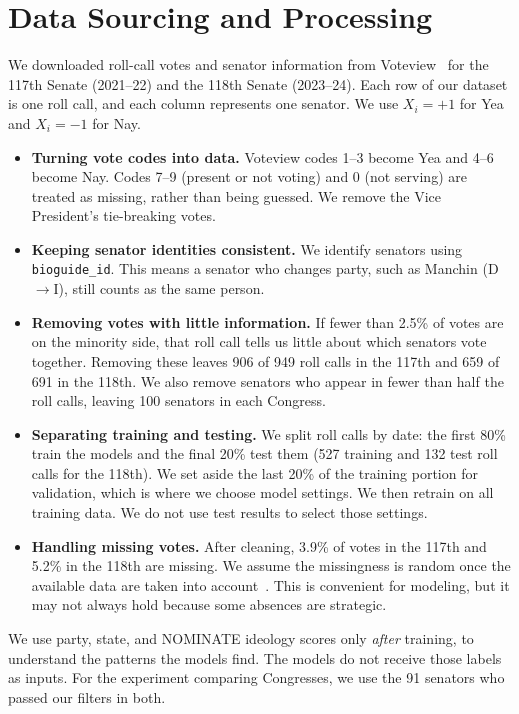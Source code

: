 \documentclass[10pt]{article}
\begin{document}
\section{Data Sourcing and Processing}
We downloaded roll-call votes and senator information from Voteview~\cite{voteview} for the 117th Senate (2021--22) and the 118th Senate (2023--24). Each row of our dataset is one roll call, and each column represents one senator. We use $X_i=+1$ for Yea and $X_i=-1$ for Nay.
\begin{itemize}
\item \textbf{Turning vote codes into data.} Voteview codes 1--3 become Yea and 4--6 become Nay. Codes 7--9 (present or not voting) and 0 (not serving) are treated as missing, rather than being guessed. We remove the Vice President's tie-breaking votes.
\item \textbf{Keeping senator identities consistent.} We identify senators using \texttt{bioguide\_id}. This means a senator who changes party, such as Manchin (D$\to$I), still counts as the same person.
\item \textbf{Removing votes with little information.} If fewer than 2.5\% of votes are on the minority side, that roll call tells us little about which senators vote together. Removing these leaves 906 of 949 roll calls in the 117th and 659 of 691 in the 118th. We also remove senators who appear in fewer than half the roll calls, leaving 100 senators in each Congress.
\item \textbf{Separating training and testing.} We split roll calls by date: the first 80\% train the models and the final 20\% test them (527 training and 132 test roll calls for the 118th). We set aside the last 20\% of the training portion for validation, which is where we choose model settings. We then retrain on all training data. We do not use test results to select those settings.
\item \textbf{Handling missing votes.} After cleaning, 3.9\% of votes in the 117th and 5.2\% in the 118th are missing. We assume the missingness is random once the available data are taken into account~\cite{rubin1976}. This is convenient for modeling, but it may not always hold because some absences are strategic.
\end{itemize}

We use party, state, and NOMINATE ideology scores only \emph{after} training, to understand the patterns the models find. The models do not receive those labels as inputs. For the experiment comparing Congresses, we use the 91 senators who passed our filters in both.
\end{document}
